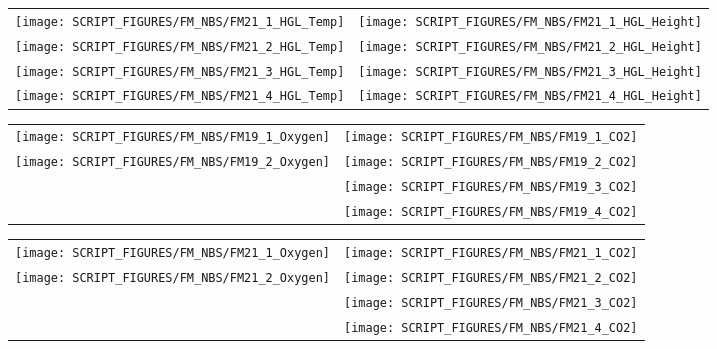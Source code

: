 \begin{figure}[p]
\begin{tabular*}{\textwidth}{l@{\extracolsep{\fill}}r}
\texttt{[image: SCRIPT\_FIGURES/FM\_NBS/FM21\_1\_HGL\_Temp]} &
\texttt{[image: SCRIPT\_FIGURES/FM\_NBS/FM21\_1\_HGL\_Height]} \\
\texttt{[image: SCRIPT\_FIGURES/FM\_NBS/FM21\_2\_HGL\_Temp]} &
\texttt{[image: SCRIPT\_FIGURES/FM\_NBS/FM21\_2\_HGL\_Height]} \\
\texttt{[image: SCRIPT\_FIGURES/FM\_NBS/FM21\_3\_HGL\_Temp]} &
\texttt{[image: SCRIPT\_FIGURES/FM\_NBS/FM21\_3\_HGL\_Height]} \\
\texttt{[image: SCRIPT\_FIGURES/FM\_NBS/FM21\_4\_HGL\_Temp]} &
\texttt{[image: SCRIPT\_FIGURES/FM\_NBS/FM21\_4\_HGL\_Height]}
\end{tabular*}
\end{figure}

\begin{figure}[p]
\begin{tabular*}{\textwidth}{l@{\extracolsep{\fill}}r}
\texttt{[image: SCRIPT\_FIGURES/FM\_NBS/FM19\_1\_Oxygen]} &
\texttt{[image: SCRIPT\_FIGURES/FM\_NBS/FM19\_1\_CO2]} \\
\texttt{[image: SCRIPT\_FIGURES/FM\_NBS/FM19\_2\_Oxygen]} &
\texttt{[image: SCRIPT\_FIGURES/FM\_NBS/FM19\_2\_CO2]} \\
 &
\texttt{[image: SCRIPT\_FIGURES/FM\_NBS/FM19\_3\_CO2]} \\
&
\texttt{[image: SCRIPT\_FIGURES/FM\_NBS/FM19\_4\_CO2]}
\end{tabular*}
\end{figure}

\begin{figure}[p]
\begin{tabular*}{\textwidth}{l@{\extracolsep{\fill}}r}
\texttt{[image: SCRIPT\_FIGURES/FM\_NBS/FM21\_1\_Oxygen]} &
\texttt{[image: SCRIPT\_FIGURES/FM\_NBS/FM21\_1\_CO2]} \\
\texttt{[image: SCRIPT\_FIGURES/FM\_NBS/FM21\_2\_Oxygen]} &
\texttt{[image: SCRIPT\_FIGURES/FM\_NBS/FM21\_2\_CO2]} \\
 &
\texttt{[image: SCRIPT\_FIGURES/FM\_NBS/FM21\_3\_CO2]} \\
&
\texttt{[image: SCRIPT\_FIGURES/FM\_NBS/FM21\_4\_CO2]}
\end{tabular*}
\end{figure}

